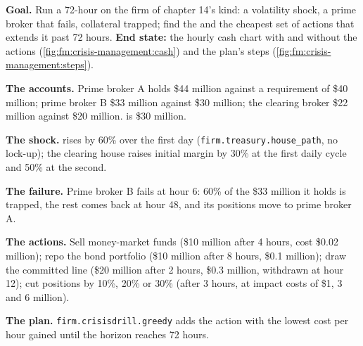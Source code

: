 \begin{tutorial}
\textbf{Goal.} Run a 72-hour  on the firm of chapter 14's kind: a volatility shock, a prime broker that fails, collateral trapped; find
the  and the cheapest set of actions that extends it past 72 hours. \textbf{End state:} the hourly cash chart with and without the
actions (\cref{fig:fm:crisis-management:cash}) and the plan's steps (\cref{fig:fm:crisis-management:steps}).
\begin{tutsteps}
\item \textbf{The accounts.} Prime broker A holds \$44 million against a requirement of \$40 million; prime broker B \$33 million against \$30 million;
the clearing broker \$22 million against \$20 million.  is \$30 million.
\item \textbf{The shock.}  rises by 60\% over the first day (\texttt{firm.treasury.house\_path}, no lock-up); the clearing house raises
initial margin by 30\% at the first daily cycle and 50\% at the second.
\item \textbf{The failure.} Prime broker B fails at hour 6: 60\% of the \$33 million it holds is trapped, the rest comes back at hour 48, and its
positions move to prime broker A.
\item \textbf{The actions.} Sell money-market funds (\$10 million after 4 hours, cost \$0.02 million); repo the bond portfolio (\$10 million after 8
hours, \$0.1 million); draw the committed line (\$20 million after 2 hours, \$0.3 million, withdrawn at hour 12); cut positions by 10\%, 20\% or 30\%
(after 3 hours, at impact costs of \$1, 3 and 6 million).
\item \textbf{The plan.} \texttt{firm.crisisdrill.greedy} adds the action with the lowest cost per hour gained until the horizon reaches 72 hours.
\end{tutsteps}
\end{tutorial}

\label{lst:fm:crisis-management:run}

